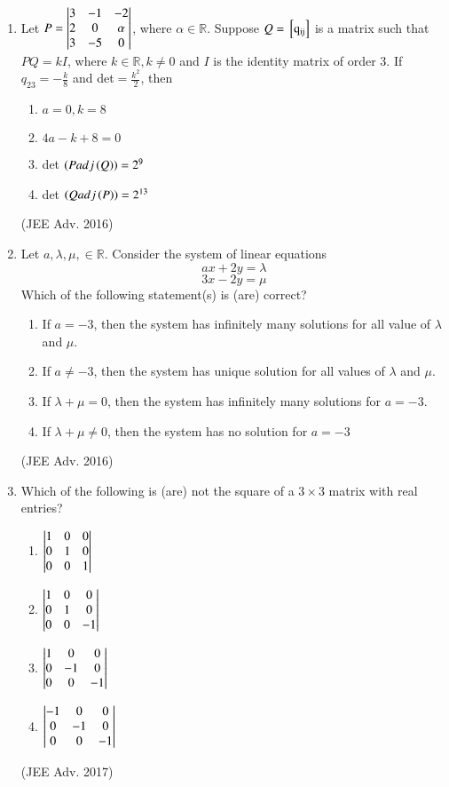\documentclass[journal,12pt,twocolumn]{IEEEtran}
\theoremstyle{remark}
\begin{document}
\begin{enumerate}
				\item 
					Let $P = 
						\begin{vmatrix}		
							3 & -1 & -2\\
							2 & 0 & \alpha\\
							3 & -5 & 0
						\end{vmatrix}$,
					where $\alpha \in \mathbb{R}$. Suppose $Q= \mathrm{{}\left[q_{ij}\right]}$ is a matrix such that $PQ=kI$, where $k \in \mathbb{R}, k \neq 0$ and $I$ is the identity matrix of order $3$. If $q_{23} = -\frac{k}{8}$ and det$= \frac{k^2}{2}$, then
					\begin{enumerate}
						\item $a=0, k=8$
						\item $4a-k+8=0$
						\item det $\left(P adj \left(Q\right)\right) = 2^9$
						\item det $\left(Q adj \left(P\right)\right) = 2^{13}$
					\end{enumerate}
					\hfill (JEE Adv. 2016)
				\item
					Let $a, \lambda, \mu, \in \mathbb{R}$. Consider the system of linear equations $$ax+2y=\lambda$$ $$3x-2y=\mu$$ Which of the following statement(s) is (are) correct?
					\begin{enumerate}
						\item If $a=-3$, then the system has infinitely many solutions for all value of $\lambda$ and $\mu$.
						\item If $a \neq -3$, then the system has unique solution for all values of $\lambda$ and $\mu$.
						\item If $\lambda + \mu = 0$, then the system has infinitely many solutions for $a = -3$.
						\item If $\lambda + \mu \neq 0$, then the system has no solution for $a = -3$
					\end{enumerate}
					\hfill (JEE Adv. 2016)\\
				\item 
					Which of the following is (are) not the square of a $3 \times 3$ matrix with real entries?
						\begin{enumerate}
							\item 
								$\begin{vmatrix}
									1&0&0\\
									0&1&0\\
									0&0&1
								\end{vmatrix}$\\
							\item 
								$\begin{vmatrix}
									1&0&0\\
									0&1&0\\
									0&0&-1
								\end{vmatrix}$\\
							\item 
								$\begin{vmatrix}
									1&0&0\\
									0&-1&0\\
									0&0&-1
								\end{vmatrix}$\\
							\item 
								$\begin{vmatrix}
									-1&0&0\\
									0&-1&0\\
									0&0&-1
								\end{vmatrix}$\\
						\end{enumerate}
						\hfill (JEE Adv. 2017)\\	
			\end{enumerate}
\end{document}

